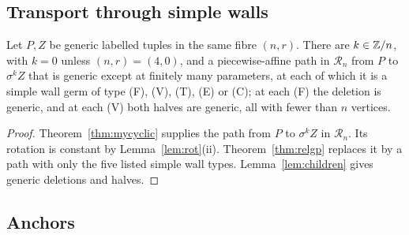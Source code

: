 \subsection{Transport through simple walls}



\begin{lemma}[transport]\label{lem:transport}
Let $P,Z$ be generic labelled tuples in the same fibre $(n,r)$. There are
$k\in\mathbb Z/n$, with $k=0$ unless $(n,r)=(4,0)$, and a piecewise-affine path in
$\mathcal R_n$ from $P$ to $\sigma^kZ$ that is generic except at finitely
many parameters, at each of which it is a simple wall germ of type (F), (V),
(T), (E) or (C); at each (F) the deletion is generic, and at each (V) both
halves are generic, all with fewer than $n$ vertices. 
\end{lemma}
\begin{proof}
Theorem~\ref{thm:mycyclic} supplies the path from $P$ to $\sigma^kZ$
in $\mathcal R_n$. Its rotation is constant by Lemma~\ref{lem:rot}(ii).
Theorem~\ref{thm:relgp} replaces it by a path with only the five listed
simple wall types. Lemma~\ref{lem:children} gives generic deletions and
halves.
\end{proof}

\subsection{Anchors}

